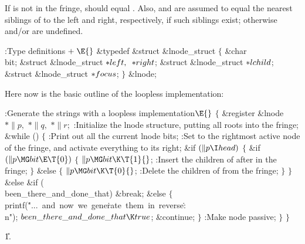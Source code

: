If  is not in the fringe,  should equal .
Also,  and  are assumed to
equal the nearest siblings of  to the left and right, respectively,
if such siblings exist; otherwise  and/or  are undefined.

\Y\B\4:Type definitions\X${}\mathrel+\E{}$\6
\&{typedef} \&{struct} \&{lnode\_struct} ${}\{{}$\1\6
\&{char} \\{bit};\6
\&{struct} \&{lnode\_struct} ${}{*}\\{left},{}$ ${}{*}\\{right}{}$;\6
\&{struct} \&{lnode\_struct} ${}{*}\\{lchild}{}$;\6
\&{struct} \&{lnode\_struct} ${}{*}\\{focus}{}$;\2\6
${}\}{}$ \&{lnode};\par
\fi

Here now is the basic outline of the loopless implementation:

\Y\B\4:Generate the strings with a loopless implementation\X${}\E{}$\6
${}\{{}$\1\6
\&{register} \&{lnode} ${}{*}\|p,{}$ ${}{*}\|q,{}$ ${}{*}\|r;{}$\7
:Initialize the lnode structure, putting all roots into the fringe\X;\6
\&{while} ()\5
${}\{{}$\1\6
:Print out all the current lnode bits\X;\6
:Set  to the rightmost active node of the fringe, and activate
everything to its right\X;\6
\&{if} ${}(\|p\I\\{head}){}$\5
${}\{{}$\1\6
\&{if} ${}(\|p\MG\\{bit}\E\T{0}){}$\5
${}\{{}$\1\6
${}\|p\MG\\{bit}\K\T{1}{}$;\6
:Insert the children of  after  in the fringe\X;\6
\4${}\}{}$\5
\2\&{else}\5
${}\{{}$\1\6
${}\|p\MG\\{bit}\K\T{0}{}$;\6
:Delete the children of  from the fringe\X;\6
\4${}\}{}$\2\6
\4${}\}{}$\5
\2\&{else} \&{if} (\\{been\_there\_and\_done\_that})\1\5
\&{break};\2\6
\&{else}\5
${}\{{}$\1\6
\\{printf}(\.{"...\ and\ now\ we\ gene}\)\.{rate\ them\ in\ reverse}\)\.{:%
\\n"});\6
${}\\{been\_there\_and\_done\_that}\K\\{true}{}$;\5
\&{continue};\6
\4${}\}{}$\2\6
:Make node  passive\X;\6
\4${}\}{}$\2\6
\4${}\}{}$\2\par
\U1.\fi

